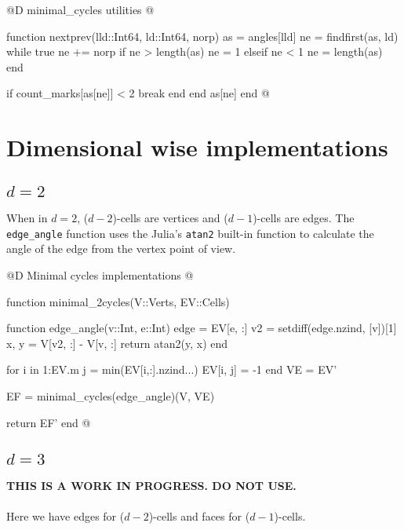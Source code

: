 @D minimal\_cycles utilities
@{function nextprev(lld::Int64, ld::Int64, norp)
    as = angles[lld]
    ne = findfirst(as, ld)
    while true
        ne += norp
        if ne > length(as)
            ne = 1
        elseif ne < 1
            ne = length(as)
        end

        if count_marks[as[ne]] < 2
            break
        end
    end
    as[ne]
end
@}



\section{Dimensional wise implementations}
\label{sec:angles_fn}

\subsection{$d=2$}

When in $d=2$, ($d-2$)-cells are vertices and ($d-1$)-cells are edges.
The \texttt{edge\_angle} function uses the Julia's \texttt{atan2} 
built-in function to calculate the angle of the edge from the vertex point of view.

@D Minimal cycles implementations
@{function minimal_2cycles(V::Verts, EV::Cells)

    function edge_angle(v::Int, e::Int)
        edge = EV[e, :]
        v2 = setdiff(edge.nzind, [v])[1]
        x, y = V[v2, :] - V[v, :]
        return atan2(y, x)
    end

    for i in 1:EV.m
        j = min(EV[i,:].nzind...)
        EV[i, j] = -1
    end
    VE = EV'

    EF = minimal_cycles(edge_angle)(V, VE)

    return EF'
end
@}


\subsection{$d=3$}

\textbf{THIS IS A WORK IN PROGRESS. DO NOT USE.}\\ \\
Here we have edges for ($d-2$)-cells and faces for ($d-1$)-cells.



